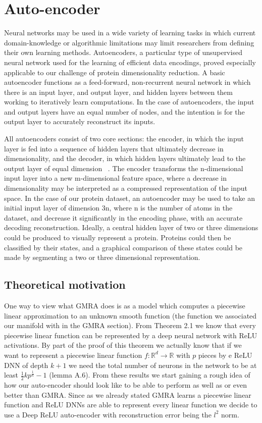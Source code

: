\documentclass{article}
\begin{document}
\section{Auto-encoder}
Neural networks may be used in a wide variety of learning tasks in which current domain-knowledge or algorithmic limitations may limit researchers from defining their own learning methods. Autoencoders, a particular type of unsupervised neural network used for the learning of efficient data encodings, proved especially applicable to our challenge of protein dimensionality reduction. A basic autoencoder functions as a feed-forward, non-recurrent neural network in which there is an input layer, and output layer, and hidden layers between them working to iteratively learn computations. In the case of autoencoders, the input and output layers have an equal number of nodes, and the intention is for the output layer to accurately reconstruct its inputs.

All autoencoders consist of two core sections: the encoder, in which the input layer is fed into a sequence of hidden layers that ultimately decrease in dimensionality, and the decoder, in which hidden layers ultimately lead to the output layer of equal dimension ~\cite{autoencoderintro}. The encoder transforms the n-dimensional input layer into a new m-dimensional feature space, where a decrease in dimensionality may be interpreted as a compressed representation of the input space. In the case of our protein dataset, an autoencoder may be used to take an initial input layer of dimension 3n, where n is the number of atoms in the dataset, and decrease it significantly in the encoding phase, with an accurate decoding reconstruction. Ideally, a central hidden layer of two or three dimensions could be produced to visually represent a protein. Proteins could then be classified by their states, and a graphical comparison of these states could be made by segmenting a two or three dimensional representation.

\subsection{Theoretical motivation}
One way to view what GMRA does is as a model which computes a piecewise linear approximation to an unknown smooth function (the function we associated our manifold with in the GMRA section). From \cite{arora2016understanding} Theorem 2.1 we know that every piecewise linear function can be represented by a deep neural network with ReLU activations. By part of the proof of this theorem we actually know that if we want to represent a piecewise linear function $f:\mathbb{R}^d \rightarrow \mathbb{R}$ with $p$ pieces by e ReLU DNN of depth $k+1$ we need the total number of neurons in the network to be at least $\frac{1}{2}kp^{\frac{1}{k}}-1$ (lemma A.6). From these results we start gaining a rough idea of how our auto-encoder should look like to be able to perform as well as or even better than GMRA. Since as we already stated GMRA learns a piecewise linear function and ReLU DNNs are able to represent every linear function we decide to use a Deep ReLU auto-encoder with reconstruction error being the $l^2$ norm.
\end{document}
